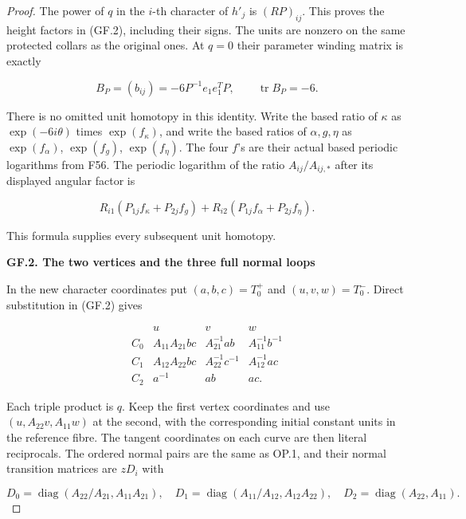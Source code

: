 \begin{proof}
The power of \(q\) in the \(i\)-th character of \(h'_j\) is \((RP)_{ij}\).
This proves the height factors in (GF.2), including their signs.
The units are nonzero on the same protected collars as the original
ones. At \(q=0\) their parameter winding matrix is exactly

\[
 B_P=(b_{ij})=-6P^{-1}e_1e_1^TP,
                    \qquad\operatorname{tr}B_P=-6.   \tag{GF.4}
\]

There is no omitted unit homotopy in this identity. Write the based
ratio of \(\kappa\) as \(\exp(-6i\theta)\) times \(\exp(f_\kappa)\), and write the
based ratios of \(\alpha,g,\eta\) as \(\exp(f_\alpha)\), \(\exp(f_g)\), \(\exp(f_\eta)\).
The four \(f\)'s are their actual based periodic logarithms from F56.
The periodic logarithm of the ratio \(A_{ij}/A_{ij,*}\) after its displayed
angular factor is

\[
 R_{i1}(P_{1j}f_\kappa+P_{2j}f_g)
       +R_{i2}(P_{1j}f_\alpha+P_{2j}f_\eta).          \tag{GF.5}
\]

This formula supplies every subsequent unit homotopy.

\par

\medskip\noindent\textbf{GF.2. The two vertices and the three full normal loops}

\par\nobreak

In the new character coordinates put \((a,b,c)=T^+_0\) and
\((u,v,w)=T^-_0\). Direct substitution in (GF.2) gives

\[
\begin{array}{c|ccc}
 &u&v&w\\ \hline
 C_0&A_{11}A_{21}bc&A_{21}^{-1}ab&A_{11}^{-1}b^{-1}\\
 C_1&A_{12}A_{22}bc&A_{22}^{-1}c^{-1}&A_{12}^{-1}ac\\
 C_2&a^{-1}&ab&ac.
\end{array}                                                   \tag{GF.6}
\]

Each triple product is \(q\). Keep the first vertex coordinates and
use \((u,A_{22}v,A_{11}w)\) at the second, with the corresponding
initial constant units in the reference fibre. The tangent
coordinates on each curve are then literal reciprocals. The
ordered normal pairs are the same as OP.1, and their normal
transition matrices are \(zD_i\) with

\[
 D_0=\operatorname{diag}(A_{22}/A_{21},A_{11}A_{21}),\quad
 D_1=\operatorname{diag}(A_{11}/A_{12},A_{12}A_{22}),\quad
 D_2=\operatorname{diag}(A_{22},A_{11}).                \tag{GF.7}
\]


\end{proof}
